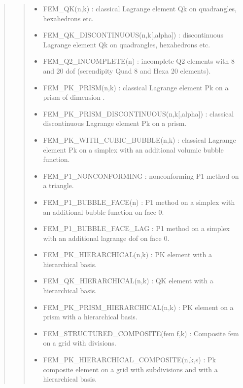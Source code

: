 \documentclass[a4paper,11pt,english]{sphinxmanual}
\begin{document}
\begin{quote}
\begin{quote}
\begin{itemize}
\item {} 
FEM\_QK(n,k) :
classical Lagrange element Qk on quadrangles, hexahedrons etc.

\item {} 
FEM\_QK\_DISCONTINUOUS(n,k{[},alpha{]}) :
discontinuous Lagrange element Qk on quadrangles, hexahedrons etc.

\item {} 
FEM\_Q2\_INCOMPLETE(n) :
incomplete Q2 elements with 8 and 20 dof (serendipity Quad 8 and
Hexa 20 elements).

\item {} 
FEM\_PK\_PRISM(n,k) :
classical Lagrange element Pk on a prism of dimension .

\item {} 
FEM\_PK\_PRISM\_DISCONTINUOUS(n,k{[},alpha{]}) :
classical discontinuous Lagrange element Pk on a prism.

\item {} 
FEM\_PK\_WITH\_CUBIC\_BUBBLE(n,k) :
classical Lagrange element Pk on a simplex with an additional
volumic bubble function.

\item {} 
FEM\_P1\_NONCONFORMING :
non\sphinxhyphen{}conforming P1 method on a triangle.

\item {} 
FEM\_P1\_BUBBLE\_FACE(n) :
P1 method on a simplex with an additional bubble function on face 0.

\item {} 
FEM\_P1\_BUBBLE\_FACE\_LAG :
P1 method on a simplex with an additional lagrange dof on face 0.

\item {} 
FEM\_PK\_HIERARCHICAL(n,k) :
PK element with a hierarchical basis.

\item {} 
FEM\_QK\_HIERARCHICAL(n,k) :
QK element with a hierarchical basis.

\item {} 
FEM\_PK\_PRISM\_HIERARCHICAL(n,k) :
PK element on a prism with a hierarchical basis.

\item {} 
FEM\_STRUCTURED\_COMPOSITE(fem f,k) :
Composite fem  on a grid with  divisions.

\item {} 
FEM\_PK\_HIERARCHICAL\_COMPOSITE(n,k,s) :
Pk composite element on a grid with  subdivisions and with a
hierarchical basis.


\end{itemize}
\end{quote}
\end{quote}
\end{document}
